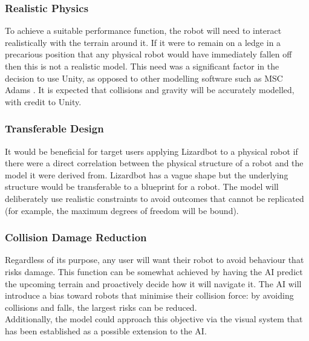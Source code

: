 \documentclass{article}
\begin{document}
\subsubsection{Realistic Physics}
\label{sec:Realistic Physics}
To achieve a suitable performance function, the robot will need to interact realistically with the terrain around it. If it were to remain on a ledge in a precarious position that any physical robot would have immediately fallen off then this is not a realistic model. 
This need was a significant factor in the decision to use Unity, as opposed to other modelling software such as MSC Adams . It is expected that collisions and gravity will be accurately modelled, with credit to Unity.


\subsubsection{Transferable Design}
\label{sec:Transferable Design}
It would be beneficial for target users applying Lizardbot to a physical robot if there were a direct correlation between the physical structure of a robot and the model it were derived from. Lizardbot has a vague shape but the underlying structure would be transferable to a blueprint for a robot. The model will deliberately use realistic constraints to avoid outcomes that cannot be replicated (for example, the maximum degrees of freedom will be bound).

\subsubsection{Collision Damage Reduction}
\label{sec:Risk Reduction}
Regardless of its purpose, any user will want their robot to avoid behaviour that risks damage. This function can be somewhat achieved by having the AI predict the upcoming terrain and proactively decide how it will navigate it. The AI will introduce a bias toward robots that minimise their collision force: by avoiding collisions and falls, the largest risks can be reduced. \\
Additionally, the model could approach this objective via the visual system that has been established as a possible extension to the AI.
\end{document}
